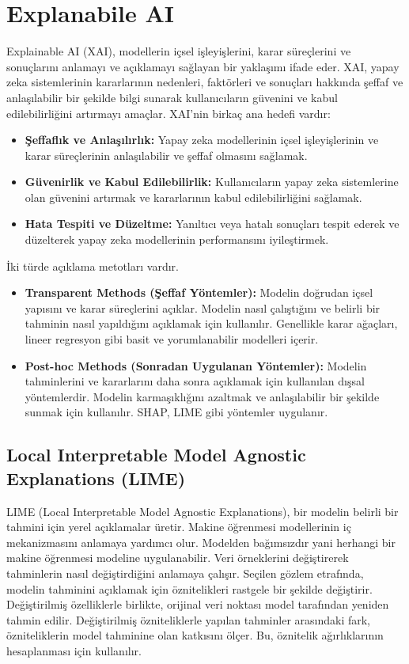 \section{Explanabile AI}
Explainable AI (XAI), modellerin içsel işleyişlerini, karar süreçlerini ve sonuçlarını anlamayı ve açıklamayı sağlayan bir yaklaşımı ifade eder. XAI, yapay zeka sistemlerinin kararlarının nedenleri, faktörleri ve sonuçları hakkında şeffaf ve anlaşılabilir bir şekilde bilgi sunarak kullanıcıların güvenini ve kabul edilebilirliğini artırmayı amaçlar. XAI'nin birkaç ana hedefi vardır:
\begin{itemize}
    \item \textbf{Şeffaflık ve Anlaşılırlık:} Yapay zeka modellerinin içsel işleyişlerinin ve karar süreçlerinin anlaşılabilir ve şeffaf olmasını sağlamak.
    \item \textbf{Güvenirlik ve Kabul Edilebilirlik:} Kullanıcıların yapay zeka sistemlerine olan güvenini artırmak ve kararlarının kabul edilebilirliğini sağlamak.
    \item \textbf{Hata Tespiti ve Düzeltme:} Yanıltıcı veya hatalı sonuçları tespit ederek ve düzelterek yapay zeka modellerinin performansını iyileştirmek.
\end{itemize}

İki türde açıklama metotları vardır.
\begin{itemize}
    \item \textbf{Transparent Methods (Şeffaf Yöntemler):} Modelin doğrudan içsel yapısını ve karar süreçlerini açıklar. Modelin nasıl çalıştığını ve belirli bir tahminin nasıl yapıldığını açıklamak için kullanılır. Genellikle karar ağaçları, lineer regresyon gibi basit ve yorumlanabilir modelleri içerir.
    \item \textbf{Post-hoc Methods (Sonradan Uygulanan Yöntemler):} Modelin tahminlerini ve kararlarını daha sonra açıklamak için kullanılan dışsal yöntemlerdir. Modelin karmaşıklığını azaltmak ve anlaşılabilir bir şekilde sunmak için kullanılır. SHAP, LIME gibi yöntemler uygulanır.
\end{itemize}

\subsection{Local Interpretable Model Agnostic Explanations (LIME)}
LIME (Local Interpretable Model Agnostic Explanations), bir modelin belirli bir tahmini için yerel açıklamalar üretir. Makine öğrenmesi modellerinin iç mekanizmasını anlamaya yardımcı olur. Modelden bağımsızdır yani herhangi bir makine öğrenmesi modeline uygulanabilir. Veri örneklerini değiştirerek tahminlerin nasıl değiştirdiğini anlamaya çalışır. Seçilen gözlem etrafında, modelin tahminini açıklamak için öznitelikleri rastgele bir şekilde değiştirir. Değiştirilmiş özelliklerle birlikte, orijinal veri noktası model tarafından yeniden tahmin edilir.  Değiştirilmiş özniteliklerle yapılan tahminler arasındaki fark, özniteliklerin model tahminine olan katkısını ölçer. Bu, öznitelik ağırlıklarının hesaplanması için kullanılır.

